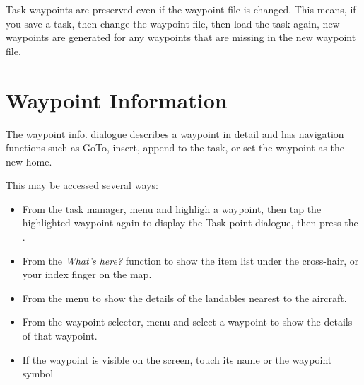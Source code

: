 Task waypoints are preserved even if the waypoint
file is changed.  This means, if you save a task, then change the
waypoint file, then load the task again, new waypoints are generated
for any waypoints that are missing in the new waypoint file.

\section{Waypoint Information}

The waypoint info. dialogue describes a waypoint in detail and has
navigation functions such as GoTo, insert, append to the task, or set the 
waypoint as the new home.

This may be accessed several ways:
\begin{itemize}
\item
From the task manager, menu \blink{} 
and highligh a waypoint, then tap the highlighted waypoint again to display the 
Task point dialogue, then press the  \InfoBox.

\item 
From the {\it What's here?} function to show the
item list under the cross-hair, or your index finger on the map.

\item
From the menu \blink{} to show the
details of the landables nearest to the aircraft.

\item
From the waypoint selector, menu \blink{} and select a waypoint to show the details of that waypoint.

\item
If the waypoint is visible on the screen, touch its name or the waypoint symbol


\end{itemize}

